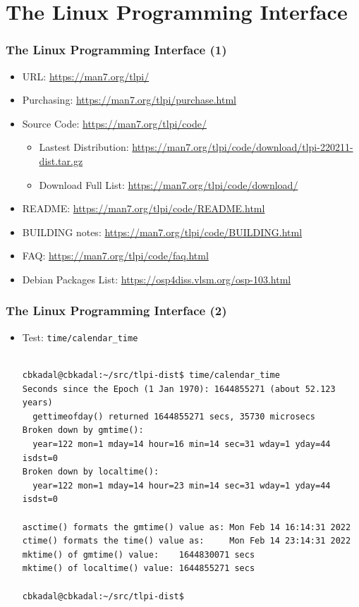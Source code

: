 \documentclass[aspectratio=169, xcolor=table, notheorems, hyperref={pdfpagelabels=false}]{beamer}
\begin{document}
\section{The Linux Programming Interface}
\begin{frame}[fragile]
\frametitle{The Linux Programming Interface (1)}
\begin{itemize}
\item URL: \url{https://man7.org/tlpi/}
\item Purchasing: \url{https://man7.org/tlpi/purchase.html}
\item Source Code: \url{https://man7.org/tlpi/code/}
\begin{itemize}
\item Lastest Distribution: \url{https://man7.org/tlpi/code/download/tlpi-220211-dist.tar.gz}
\item Download Full List: \url{https://man7.org/tlpi/code/download/}
\end{itemize}
\item README: \url{https://man7.org/tlpi/code/README.html}
\item BUILDING notes: \url{https://man7.org/tlpi/code/BUILDING.html}
\item FAQ: \url{https://man7.org/tlpi/code/faq.html}
\item Debian Packages List: \url{https://osp4diss.vlsm.org/osp-103.html}
\end{itemize}
\end{frame}

\begin{frame}[fragile]
\frametitle{The Linux Programming Interface (2)}
\begin{itemize}
\item Test: \texttt{time/calendar\_time}

\begin{lstlisting}[basicstyle=\ttfamily\small]

cbkadal@cbkadal:~/src/tlpi-dist$ time/calendar_time 
Seconds since the Epoch (1 Jan 1970): 1644855271 (about 52.123 years)
  gettimeofday() returned 1644855271 secs, 35730 microsecs
Broken down by gmtime():
  year=122 mon=1 mday=14 hour=16 min=14 sec=31 wday=1 yday=44 isdst=0
Broken down by localtime():
  year=122 mon=1 mday=14 hour=23 min=14 sec=31 wday=1 yday=44 isdst=0

asctime() formats the gmtime() value as: Mon Feb 14 16:14:31 2022
ctime() formats the time() value as:     Mon Feb 14 23:14:31 2022
mktime() of gmtime() value:    1644830071 secs
mktime() of localtime() value: 1644855271 secs

cbkadal@cbkadal:~/src/tlpi-dist$

\end{lstlisting}
\end{itemize}
\end{frame}
\end{document}
